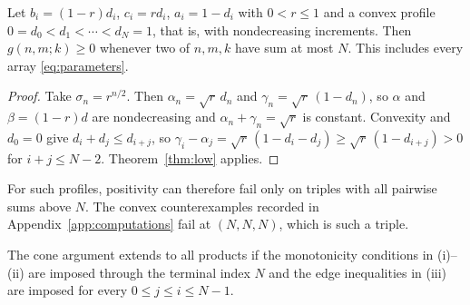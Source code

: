 \begin{corollary}\label{cor:convex-low}
Let $b_i=(1-r)d_i$, $c_i=rd_i$, $a_i=1-d_i$ with $0<r\leq1$ and a convex profile $0=d_0<d_1<\cdots<d_N=1$, that is, with nondecreasing increments. Then $g(n,m;k)\geq0$ whenever two of $n,m,k$ have sum at most $N$. This includes every array \eqref{eq:parameters}.
\end{corollary}
\begin{proof}
Take $\sigma_n=r^{n/2}$. Then $\alpha_n=\sqrt r\,d_n$ and $\gamma_n=\sqrt r\,(1-d_n)$, so $\alpha$ and $\beta=(1-r)d$ are nondecreasing and $\alpha_n+\gamma_n=\sqrt r$ is constant. Convexity and $d_0=0$ give $d_i+d_j\leq d_{i+j}$, so $\gamma_i-\alpha_j=\sqrt r\,(1-d_i-d_j)\geq\sqrt r\,(1-d_{i+j})>0$ for $i+j\leq N-2$. Theorem~\ref{thm:low} applies.
\end{proof}

For such profiles, positivity can therefore fail only on triples with all pairwise sums above $N$. The convex counterexamples recorded in Appendix~\ref{app:computations} fail at $(N,N,N)$, which is such a triple.

The cone argument extends to all products if the monotonicity conditions in (i)--(ii) are imposed through the terminal index $N$ and the edge inequalities in (iii) are imposed for every $0\leq j\leq i\leq N-1$.

